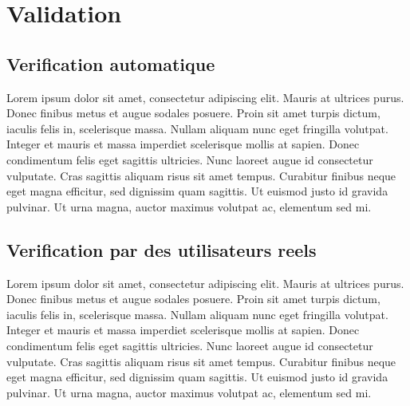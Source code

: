 \chapter{Validation}
        \section{Verification automatique}
        Lorem ipsum dolor sit amet, consectetur adipiscing elit. Mauris at ultrices purus. Donec finibus metus et augue sodales posuere. Proin sit amet turpis dictum, iaculis felis in, scelerisque massa. Nullam aliquam nunc eget fringilla volutpat. Integer et mauris et massa imperdiet scelerisque mollis at sapien. Donec condimentum felis eget sagittis ultricies. Nunc laoreet augue id consectetur vulputate. Cras sagittis aliquam risus sit amet tempus. Curabitur finibus neque eget magna efficitur, sed dignissim quam sagittis. Ut euismod justo id gravida pulvinar. Ut urna magna, auctor maximus volutpat ac, elementum sed mi.
        \section{Verification par des utilisateurs reels}
        Lorem ipsum dolor sit amet, consectetur adipiscing elit. Mauris at ultrices purus. Donec finibus metus et augue sodales posuere. Proin sit amet turpis dictum, iaculis felis in, scelerisque massa. Nullam aliquam nunc eget fringilla volutpat. Integer et mauris et massa imperdiet scelerisque mollis at sapien. Donec condimentum felis eget sagittis ultricies. Nunc laoreet augue id consectetur vulputate. Cras sagittis aliquam risus sit amet tempus. Curabitur finibus neque eget magna efficitur, sed dignissim quam sagittis. Ut euismod justo id gravida pulvinar. Ut urna magna, auctor maximus volutpat ac, elementum sed mi.
